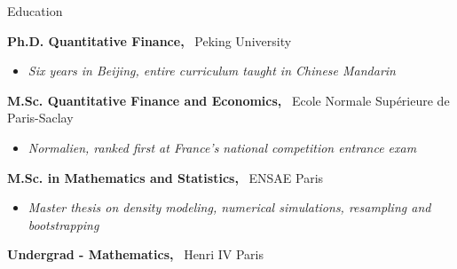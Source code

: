 \documentclass[usegeometry, 10pt, a4paper]{cv} %
\newcommand{\activite}[1]{\textbf{#1}\ }
\begin{document}
\begin{rubriquetableau}[0.95\textwidth]{Education}\\
\vspace{-0.5cm}

\activite{Ph.D. Quantitative Finance,} Peking University\\
\vspace{-0.8cm}  
\begin{itemize}[label={},
  rightmargin=\dimexpr\linewidth-13cm-\leftmargin\relax]
\item \small{\emph{Six years in Beijing, entire curriculum taught in Chinese Mandarin}}
\end{itemize}

\vspace{0.2cm}

\activite{M.Sc. Quantitative Finance and Economics,} Ecole Normale Supérieure
de Paris-Saclay \\
\vspace{-0.3cm}
\begin{itemize}[label={}, rightmargin=\dimexpr\linewidth-13cm-\leftmargin\relax]
\item \small{\emph{Normalien, ranked first at France's national competition entrance exam}}
\end{itemize}

\vspace{0.2cm}


\activite{M.Sc. in Mathematics and Statistics,} ENSAE Paris\\
\vspace{-0.3cm}
\begin{itemize}[label={}, rightmargin=\dimexpr\linewidth-13cm-\leftmargin\relax]
\item \small{\emph{Master thesis on density modeling, numerical simulations, resampling and bootstrapping}}
\end{itemize}

\activite{Undergrad - Mathematics,} Henri IV Paris
\end{rubriquetableau}
\end{document}
